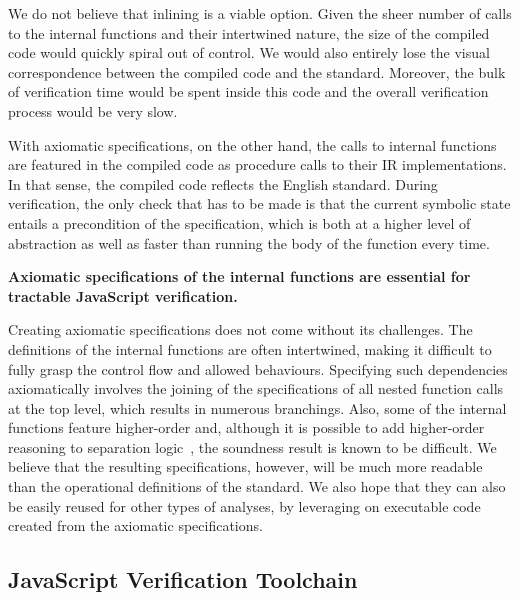\documentclass{llncs}
\newif\ifComments
\newcommand{\pg}[1]{%
\ifComments
\begin{center}
\fbox{%
\begin{minipage}{\textwidth} \color{red}
{\bf PG:} {\rm #1}
\end{minipage}
}
\end{center}
\fi
}
\begin{document}
We do not believe that inlining is a viable option. Given the sheer
number of calls to the internal functions and their intertwined
nature, the size of the compiled code would quickly spiral out of
control.
We would also entirely lose the visual correspondence between the compiled code and the standard. Moreover, the bulk of verification time would be spent inside this code and the overall verification process would be very slow.

With axiomatic specifications, on the other hand, the calls to internal functions are featured in the compiled code as procedure calls to their IR implementations. In that sense, the compiled code reflects the English standard. During verification, the only check that has to be made is that the current symbolic state entails a precondition of the specification, which is both at a higher level of abstraction as well as faster than running the body of the function every time. 

\begin{center}
{\bfseries \small
Axiomatic specifications of the internal functions are essential for tractable JavaScript verification.
}
\end{center}

Creating axiomatic specifications does not come without its challenges. 
The definitions of the internal functions are often intertwined, making it difficult to fully grasp the control flow and allowed behaviours. 
Specifying such dependencies axiomatically involves the joining of the
specifications of all nested function calls at the top level, which
results in numerous branchings. 
Also, some of the internal functions feature higher-order and, although it is
possible to add higher-order reasoning to separation logic~\cite{chords}, the
soundness result is known to be difficult. 
We believe that the resulting specifications, however, will be  much more
readable than the operational definitions of the standard. We also
hope that they can also be easily reused for other types of analyses,
by leveraging on executable code created from the axiomatic
specifications. 


\subsection{JavaScript Verification Toolchain}

\end{document}
